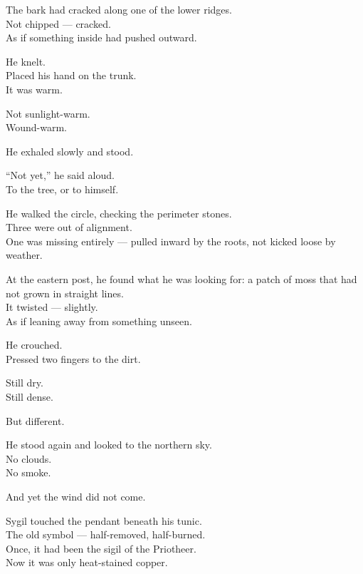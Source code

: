 \documentclass[9pt]{article}
\begin{document}
The bark had cracked along one of the lower ridges.\\
Not chipped — cracked.\\
As if something inside had pushed outward.

\vspace{1em}

He knelt.\\
Placed his hand on the trunk.\\
It was warm.

Not sunlight-warm.\\
Wound-warm.

He exhaled slowly and stood.

\vspace{1em}

“Not yet,” he said aloud.\\
To the tree, or to himself.

\vspace{1em}

He walked the circle, checking the perimeter stones.\\
Three were out of alignment.\\
One was missing entirely — pulled inward by the roots, not kicked loose by weather.

At the eastern post, he found what he was looking for: a patch of moss that had not grown in straight lines.\\
It twisted — slightly.\\
As if leaning away from something unseen.

\vspace{1em}

He crouched.\\
Pressed two fingers to the dirt.

Still dry.\\
Still dense.

But different.

\vspace{1em}

He stood again and looked to the northern sky.\\
No clouds.\\
No smoke.

And yet the wind did not come.

\vspace{1em}

Sygil touched the pendant beneath his tunic.\\
The old symbol — half-removed, half-burned.\\
Once, it had been the sigil of the Priotheer.\\
Now it was only heat-stained copper.
\end{document}
